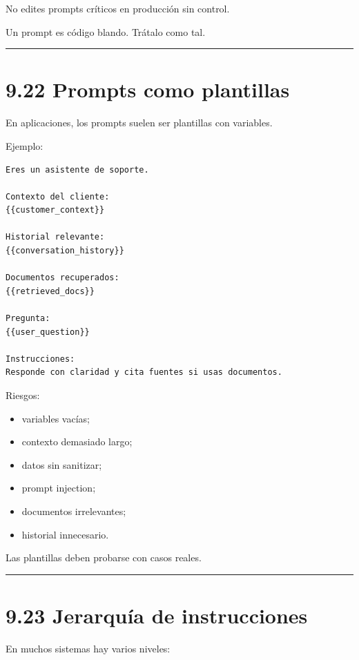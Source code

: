 No edites prompts críticos en producción sin control.

Un prompt es código blando. Trátalo como tal.

\begin{center}\rule{0.5\linewidth}{0.5pt}\end{center}

\section{9.22 Prompts como plantillas}\label{prompts-como-plantillas}

En aplicaciones, los prompts suelen ser plantillas con variables.

Ejemplo:

\begin{lstlisting}
Eres un asistente de soporte.

Contexto del cliente:
{{customer_context}}

Historial relevante:
{{conversation_history}}

Documentos recuperados:
{{retrieved_docs}}

Pregunta:
{{user_question}}

Instrucciones:
Responde con claridad y cita fuentes si usas documentos.
\end{lstlisting}

Riesgos:

\begin{itemize}
\tightlist
\item
  variables vacías;
\item
  contexto demasiado largo;
\item
  datos sin sanitizar;
\item
  prompt injection;
\item
  documentos irrelevantes;
\item
  historial innecesario.
\end{itemize}

Las plantillas deben probarse con casos reales.

\begin{center}\rule{0.5\linewidth}{0.5pt}\end{center}

\section{9.23 Jerarquía de
instrucciones}\label{jerarquuxeda-de-instrucciones}

En muchos sistemas hay varios niveles:

